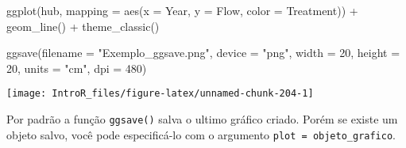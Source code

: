 \documentclass[
]{book}
\newenvironment{Shaded}{\begin{snugshade}}{\end{snugshade}}
\newcommand{\AttributeTok}[1]{\textcolor[rgb]{0.77,0.63,0.00}{#1}}
\newcommand{\DecValTok}[1]{\textcolor[rgb]{0.00,0.00,0.81}{#1}}
\newcommand{\FunctionTok}[1]{\textcolor[rgb]{0.00,0.00,0.00}{#1}}
\newcommand{\NormalTok}[1]{#1}
\newcommand{\SpecialCharTok}[1]{\textcolor[rgb]{0.00,0.00,0.00}{#1}}
\newcommand{\StringTok}[1]{\textcolor[rgb]{0.31,0.60,0.02}{#1}}
\begin{document}
\begin{Shaded}
\begin{Highlighting}[]
\FunctionTok{ggplot}\NormalTok{(hub, }\AttributeTok{mapping =} \FunctionTok{aes}\NormalTok{(}\AttributeTok{x =}\NormalTok{ Year, }\AttributeTok{y =}\NormalTok{ Flow, }\AttributeTok{color =}\NormalTok{ Treatment)) }\SpecialCharTok{+}
  \FunctionTok{geom\_line}\NormalTok{() }\SpecialCharTok{+}
  \FunctionTok{theme\_classic}\NormalTok{()}

\FunctionTok{ggsave}\NormalTok{(}\AttributeTok{filename =} \StringTok{"Exemplo\_ggsave.png"}\NormalTok{, }
       \AttributeTok{device =} \StringTok{"png"}\NormalTok{,}
       \AttributeTok{width =} \DecValTok{20}\NormalTok{, }
       \AttributeTok{height =} \DecValTok{20}\NormalTok{,}
       \AttributeTok{units =} \StringTok{"cm"}\NormalTok{,}
       \AttributeTok{dpi =} \DecValTok{480}\NormalTok{)  }
\end{Highlighting}
\end{Shaded}

\begin{center}\texttt{[image: IntroR\_files/figure-latex/unnamed-chunk-204-1]} \end{center}

Por padrão a função \texttt{ggsave()} salva o ultimo gráfico criado. Porém se existe um objeto salvo, você pode especificá-lo com o argumento \texttt{plot\ =\ objeto\_grafico}.

  
\end{document}
